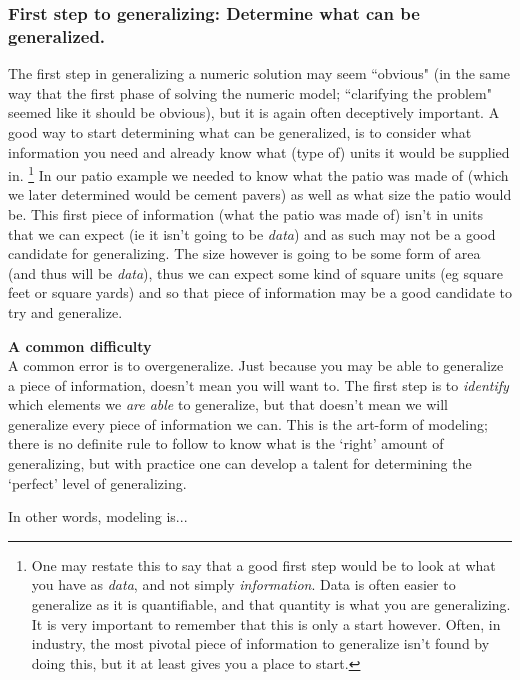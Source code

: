 \documentclass{ximera}
\begin{document}
\subsubsection*{First step to generalizing: Determine what can be generalized.}
    The first step in generalizing a numeric solution may seem ``obvious" (in the same way that the first phase of solving the numeric model; ``clarifying the problem" seemed like it should be obvious), but it is again often deceptively important. A good way to start determining what can be generalized, is to consider what information you need and already know what (type of) units it would be supplied in.
    \footnote{One may restate this to say that a good first step would be to look at what you have as \textit{data}, and not simply \textit{information}. Data is often easier to generalize as it is quantifiable, and that quantity is what you are generalizing. It is very important to remember that this is only a start however. Often, in industry, the most pivotal piece of information to generalize isn't found by doing this, but it at least gives you a place to start.}
    In our patio example we needed to know what the patio was made of (which we later determined would be cement pavers) as well as what size the patio would be. This first piece of information (what the patio was made of) isn't in units that we can expect (ie it isn't going to be \textit{data}) and as such may not be a good candidate for generalizing. The size however is going to be some form of area (and thus will be \textit{data}), thus we can expect some kind of square units (eg square feet or square yards) and so that piece of information may be a good candidate to try and generalize.
    
    \begin{exploration}
        {\large\bfseries A common difficulty}\\
        
        A common error is to overgeneralize. Just because you may be able to generalize a piece of information, doesn't mean you will want to. The first step is to \emph{identify} which elements we \emph{are able} to generalize, but that doesn't mean we will generalize every piece of information we can. This is the art-form of modeling; there is no definite rule to follow to know what is the `right' amount of generalizing, but with practice one can develop a talent for determining the `perfect' level of generalizing.
        
        In other words, modeling is...
        
        \begin{multipleChoice}
        \end{multipleChoice}
    \end{exploration}
\end{document}
